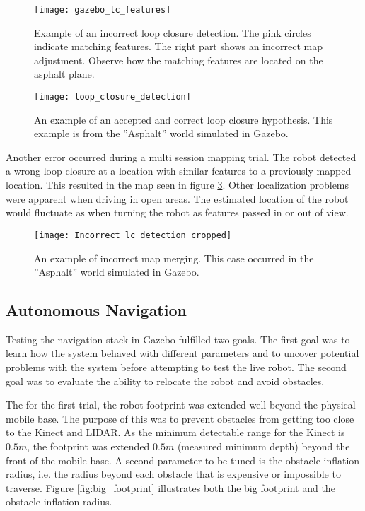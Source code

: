 \begin{figure}[h]
	\centering
	\texttt{[image: gazebo\_lc\_features]}
	\caption{Example of an incorrect loop closure detection. The pink circles indicate matching features. The right part shows an incorrect map adjustment. Observe how the matching features are located on the asphalt plane.}
	\label{fig:gazebo_lc_features}
\end{figure}

\begin{figure}[h]
	\centering
	\texttt{[image: loop\_closure\_detection]}
	\caption{An example of an accepted and correct loop closure hypothesis. This example is from the ''Asphalt'' world simulated in Gazebo.}
	\label{fig:loop_closure_detection}
\end{figure}

Another error occurred during a multi session mapping trial. The robot detected a wrong loop closure at a location with similar features to a previously mapped location. This resulted in the map seen in figure \ref{fig:Incorrect_lc_detection}. Other localization problems were apparent when driving in open areas. The estimated location of the robot would fluctuate as when turning the robot as features passed in or out of view.

\begin{figure}[h]
	\centering
	\texttt{[image: Incorrect\_lc\_detection\_cropped]}
	\caption{An example of incorrect map merging. This case occurred in the ''Asphalt'' world simulated in Gazebo.}
	\label{fig:Incorrect_lc_detection}
\end{figure}


\subsection{Autonomous Navigation}

Testing the navigation stack in Gazebo fulfilled two goals. The first goal was to learn how the system behaved with different parameters and to uncover potential problems with the system before attempting to test the live robot. The second goal was to evaluate the ability to relocate the robot and avoid obstacles. 

The for the first trial, the robot footprint was extended well beyond the physical mobile base. The purpose of this was to prevent obstacles from getting too close to the Kinect and \ac{LIDAR}. As the minimum detectable range for the Kinect is $0.5 m$, the footprint was extended $0.5 m$ (measured minimum depth) beyond the front of the mobile base. A second parameter to be tuned is the obstacle inflation radius, i.e. the radius beyond each obstacle that is expensive or impossible to traverse. Figure \ref{fig:big_footprint} illustrates both the big footprint and the obstacle inflation radius.

